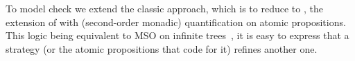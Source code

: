 
To model check \SLref we extend the classic approach, which is to
reduce to \QCTLs, the extension of \CTLs with (second-order monadic) quantification on atomic
propositions. This logic being equivalent to MSO on infinite
trees~\cite{DBLP:journals/corr/LaroussinieM14}, it is  easy to
express that a strategy (or the atomic propositions that code for it)
refines another one.


